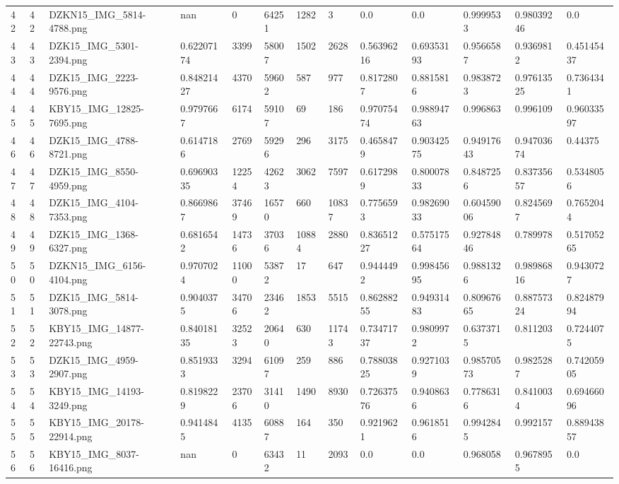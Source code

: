 \documentclass[11pt, a4paper, twoside]{report}
\begin{document}
\begin{longtable}[c]{@{}lllllllllllll@{}}
42 & 42 & DZKN15\_IMG\_5814-4788.png & nan & 0 & 64251 & 1282 & 3 & 0.0 & 0.0 & 0.9999533 & 0.98039246 & 0.0 \\
43 & 43 & DZK15\_IMG\_5301-2394.png & 0.62207174 & 3399 & 58007 & 1502 & 2628 & 0.56396216 & 0.69353193 & 0.9566587 & 0.9369812 & 0.45145437 \\
44 & 44 & DZK15\_IMG\_2223-9576.png & 0.84821427 & 4370 & 59602 & 587 & 977 & 0.8172807 & 0.8815816 & 0.9838723 & 0.97613525 & 0.7364341 \\
45 & 45 & KBY15\_IMG\_12825-7695.png & 0.9797667 & 6174 & 59107 & 69 & 186 & 0.97075474 & 0.98894763 & 0.996863 & 0.996109 & 0.96033597 \\
46 & 46 & DZK15\_IMG\_4788-8721.png & 0.6147186 & 2769 & 59296 & 296 & 3175 & 0.4658479 & 0.90342575 & 0.94917643 & 0.94703674 & 0.44375 \\
47 & 47 & DZK15\_IMG\_8550-4959.png & 0.69690335 & 12254 & 42623 & 3062 & 7597 & 0.6172989 & 0.80007833 & 0.8487256 & 0.83735657 & 0.5348056 \\
48 & 48 & DZK15\_IMG\_4104-7353.png & 0.8669867 & 37469 & 16570 & 660 & 10837 & 0.7756593 & 0.98269033 & 0.60459006 & 0.8245697 & 0.7652044 \\
49 & 49 & DZK15\_IMG\_1368-6327.png & 0.6816542 & 14736 & 37036 & 10884 & 2880 & 0.83651227 & 0.57517564 & 0.92784846 & 0.789978 & 0.51705265 \\
50 & 50 & DZKN15\_IMG\_6156-4104.png & 0.9707024 & 11000 & 53872 & 17 & 647 & 0.9444492 & 0.99845695 & 0.9881326 & 0.98986816 & 0.9430727 \\
51 & 51 & DZK15\_IMG\_5814-3078.png & 0.9040375 & 34706 & 23462 & 1853 & 5515 & 0.86288255 & 0.94931483 & 0.80967665 & 0.88757324 & 0.82487994 \\
52 & 52 & KBY15\_IMG\_14877-22743.png & 0.84018135 & 32523 & 20640 & 630 & 11743 & 0.73471737 & 0.9809972 & 0.6373715 & 0.811203 & 0.7244075 \\
53 & 53 & DZK15\_IMG\_4959-2907.png & 0.8519333 & 3294 & 61097 & 259 & 886 & 0.78803825 & 0.9271039 & 0.98570573 & 0.9825287 & 0.74205905 \\
54 & 54 & KBY15\_IMG\_14193-3249.png & 0.8198229 & 23706 & 31410 & 1490 & 8930 & 0.72637576 & 0.9408636 & 0.7786316 & 0.8410034 & 0.69466096 \\
55 & 55 & KBY15\_IMG\_20178-22914.png & 0.9414845 & 4135 & 60887 & 164 & 350 & 0.9219621 & 0.9618516 & 0.9942845 & 0.992157 & 0.88943857 \\
56 & 56 & KBY15\_IMG\_8037-16416.png & nan & 0 & 63432 & 11 & 2093 & 0.0 & 0.0 & 0.968058 & 0.9678955 & 0.0 \\

\end{longtable}
\end{document}

